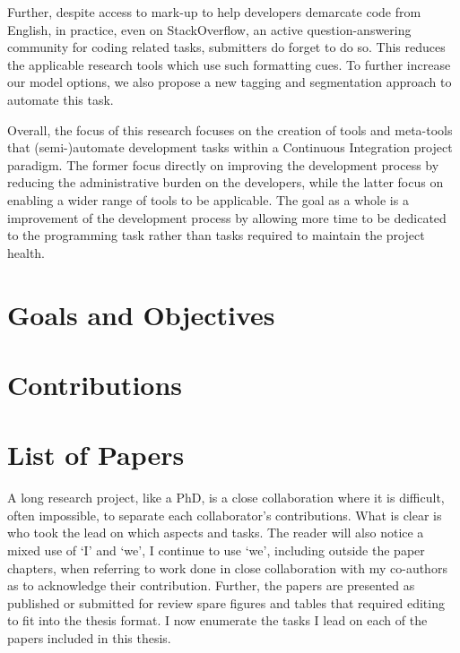 Further, despite access to mark-up to help developers demarcate code from
English, in practice, even on StackOverflow, an active question-answering
community for coding related tasks, submitters do forget to do so. This reduces
the applicable research tools which use such formatting cues. To further
increase our model options, we also propose a new tagging and segmentation
approach to automate this task.

Overall, the focus of this research focuses on the creation of tools and
meta-tools that (semi-)automate development tasks within a Continuous
Integration project paradigm. The former focus directly on improving the
development process by reducing the administrative burden on the developers,
while the latter focus on enabling a wider range of tools to be applicable. The
goal as a whole is a improvement of the development process by allowing more
time to be dedicated to the programming task rather than tasks required to
maintain the project health.

\section{Goals and Objectives}
\label{chapter:introduction:sec:goals}


\section{Contributions}
\label{chapter:introduction:sec:contrib}


\section{List of Papers}
\label{chapter:introduction:sec:papers}

A long research project, like a PhD, is a close collaboration where it is
difficult, often impossible, to separate each collaborator's contributions. What
is clear is who took the lead on which aspects and tasks. The reader will also
notice a mixed use of `I' and `we', I continue to use `we', including outside
the paper chapters, when referring to work done in close collaboration with my
co-authors as to acknowledge their contribution. Further, the papers are
presented as published or submitted for review spare figures and tables that
required editing to fit into the thesis format. I now enumerate the tasks I lead
on each of the papers included in this thesis.

